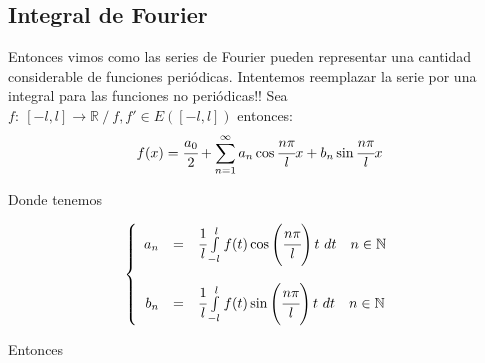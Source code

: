 \documentclass[a4paper,spanish]{article}
\def\N {\mathbb{N}}
\def\R {\mathbb{R}}
\numberwithin{equation}{section}
\begin{document}
\subsection{Integral de Fourier}
Entonces vimos como las series de Fourier pueden representar una cantidad considerable de funciones peri\'odicas. Intentemos reemplazar la serie por una integral para las funciones no peri\'odicas!!
Sea $f: \ [-l,l] \rightarrow \R \ / \ f,f' \in E([-l,l])$ entonces:
\[ f(x)= \cfrac{a_0}{2} + \sum \limits_{n=1}^{\infty}a_n\cos{\cfrac{n\pi}{l}x} + b_n \sin{\cfrac{n\pi}{l}x}\] 

Donde tenemos 

\[
\left\lbrace \begin{array}{rcl} 
a_n & = & \cfrac{1}{l} \int \limits_{-l}^{l}{f(t)\cos{\left({\cfrac{n\pi}{l}}\right)t}} \ dt \quad n \in \N \\
& & \\
b_n & = & \cfrac{1}{l} \int \limits_{-l}^{l}{f(t)\sin{\left({\cfrac{n\pi}{l}}\right)t}} \ dt \quad n \in \N
\end{array} \right.
\]

Entonces
\end{document}
